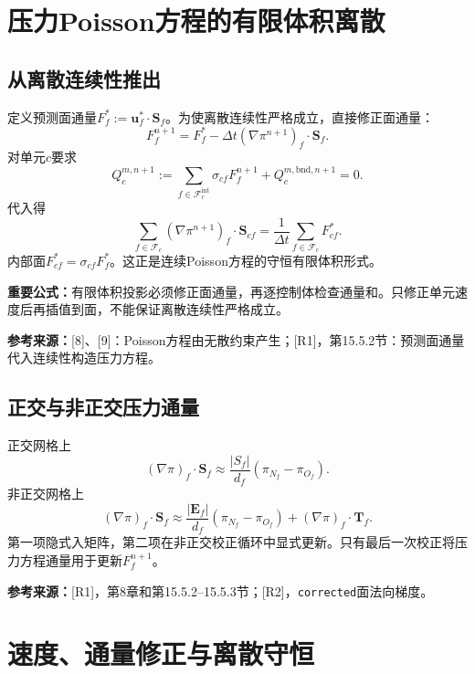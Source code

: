 \documentclass[UTF8,12pt,a4paper]{ctexart}
\numberwithin{equation}{section}
\newcommand{\dt}{\Delta t}
\newcommand{\Chorin}{\textnormal{[8]}}
\newcommand{\Guermond}{\textnormal{[9]}}
\newcommand{\Rone}{\textnormal{[R1]}}
\newcommand{\Rtwo}{\textnormal{[R2]}}
\newcommand{\source}[1]{\par\smallskip\noindent\colorbox{sourcebg}{%
  \parbox{0.955\linewidth}{\footnotesize\color{sourcegray}\textbf{参考来源：}#1}}\par\smallskip}
\newcommand{\keytitle}[1]{\par\smallskip\noindent\colorbox{keybg}{%
  \parbox{0.965\linewidth}{\color{keyblue}\textbf{重要公式：}#1}}\par\smallskip}
\begin{document}
\section{压力Poisson方程的有限体积离散}
\subsection{从离散连续性推出}
定义预测面通量$F_f^*:=\bm u_f^*\cdot\bm S_f$。为使离散连续性严格成立，直接修正面通量：
\begin{equation}
  \boxed{F_f^{n+1}
  =F_f^*-\dt(\nabla\pi^{n+1})_f\cdot\bm S_f.}
  \label{eq:flux_correction}
\end{equation}
对单元$c$要求
\begin{equation}
  Q_c^{m,n+1}:=
  \sum_{f\in\mathcal F_c^{\mathrm{int}}}\sigma_{cf}F_f^{n+1}
  +Q_c^{m,\mathrm{bnd},n+1}=0.
  \label{eq:discrete_continuity}
\end{equation}
代入得
\begin{equation}
  \boxed{\sum_{f\in\mathcal F_c}
  (\nabla\pi^{n+1})_f\cdot\bm S_{cf}
  =\frac{1}{\dt}\sum_{f\in\mathcal F_c}F_{cf}^*.}
  \label{eq:pressure_fvm}
\end{equation}
内部面$F_{cf}^*=\sigma_{cf}F_f^*$。这正是连续Poisson方程的守恒有限体积形式。
\keytitle{有限体积投影必须修正面通量，再逐控制体检查通量和。只修正单元速度后再插值到面，不能保证离散连续性严格成立。}
\source{\Chorin、\Guermond：Poisson方程由无散约束产生；\Rone，第15.5.2节：预测面通量代入连续性构造压力方程。}

\subsection{正交与非正交压力通量}
正交网格上
\begin{equation}
  (\nabla\pi)_f\cdot\bm S_f
  \approx\frac{|S_f|}{d_f}(\pi_{N_f}-\pi_{O_f}).
\end{equation}
非正交网格上
\begin{equation}
  (\nabla\pi)_f\cdot\bm S_f
  \approx\frac{|\bm E_f|}{d_f}(\pi_{N_f}-\pi_{O_f})
  +(\nabla\pi)_f\cdot\bm T_f.
  \label{eq:p_nonorth}
\end{equation}
第一项隐式入矩阵，第二项在非正交校正循环中显式更新。只有最后一次校正将压力方程通量用于更新$F_f^{n+1}$。
\source{\Rone，第8章和第15.5.2--15.5.3节；\Rtwo，\texttt{corrected}面法向梯度。}

\section{速度、通量修正与离散守恒}
\end{document}
